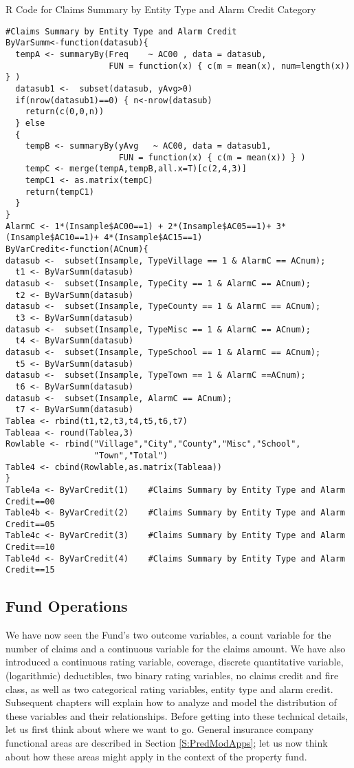 \documentclass[]{book}
\theoremstyle{definition}
\theoremstyle{definition}
\theoremstyle{definition}
\theoremstyle{remark}
\begin{document}
R Code for Claims Summary by Entity Type and Alarm Credit Category

\hypertarget{display.RateAlarmCredit.2}{}
\begin{verbatim}
#Claims Summary by Entity Type and Alarm Credit
ByVarSumm<-function(datasub){
  tempA <- summaryBy(Freq    ~ AC00 , data = datasub,   
                     FUN = function(x) { c(m = mean(x), num=length(x)) } )
  datasub1 <-  subset(datasub, yAvg>0)
  if(nrow(datasub1)==0) { n<-nrow(datasub)
    return(c(0,0,n))
  } else 
  {
    tempB <- summaryBy(yAvg   ~ AC00, data = datasub1,
                       FUN = function(x) { c(m = mean(x)) } )
    tempC <- merge(tempA,tempB,all.x=T)[c(2,4,3)]
    tempC1 <- as.matrix(tempC)
    return(tempC1)
  }
}
AlarmC <- 1*(Insample$AC00==1) + 2*(Insample$AC05==1)+ 3*(Insample$AC10==1)+ 4*(Insample$AC15==1)
ByVarCredit<-function(ACnum){
datasub <-  subset(Insample, TypeVillage == 1 & AlarmC == ACnum); 
  t1 <- ByVarSumm(datasub)
datasub <-  subset(Insample, TypeCity == 1 & AlarmC == ACnum);      
  t2 <- ByVarSumm(datasub)
datasub <-  subset(Insample, TypeCounty == 1 & AlarmC == ACnum);   
  t3 <- ByVarSumm(datasub)
datasub <-  subset(Insample, TypeMisc == 1 & AlarmC == ACnum);
  t4 <- ByVarSumm(datasub)
datasub <-  subset(Insample, TypeSchool == 1 & AlarmC == ACnum);    
  t5 <- ByVarSumm(datasub)
datasub <-  subset(Insample, TypeTown == 1 & AlarmC ==ACnum);      
  t6 <- ByVarSumm(datasub)
datasub <-  subset(Insample, AlarmC == ACnum);  
  t7 <- ByVarSumm(datasub)
Tablea <- rbind(t1,t2,t3,t4,t5,t6,t7)
Tableaa <- round(Tablea,3)
Rowlable <- rbind("Village","City","County","Misc","School",
                  "Town","Total")
Table4 <- cbind(Rowlable,as.matrix(Tableaa))
}
Table4a <- ByVarCredit(1)    #Claims Summary by Entity Type and Alarm Credit==00
Table4b <- ByVarCredit(2)    #Claims Summary by Entity Type and Alarm Credit==05 
Table4c <- ByVarCredit(3)    #Claims Summary by Entity Type and Alarm Credit==10
Table4d <- ByVarCredit(4)    #Claims Summary by Entity Type and Alarm Credit==15
\end{verbatim}

\subsection{Fund Operations}\label{fund-operations}

We have now seen the Fund's two outcome variables, a count variable for
the number of claims and a continuous variable for the claims amount. We
have also introduced a continuous rating variable, coverage, discrete
quantitative variable, (logarithmic) deductibles, two binary rating
variables, no claims credit and fire class, as well as two categorical
rating variables, entity type and alarm credit. Subsequent chapters will
explain how to analyze and model the distribution of these variables and
their relationships. Before getting into these technical details, let us
first think about where we want to go. General insurance company
functional areas are described in Section \ref{S:PredModApps}; let us
now think about how these areas might apply in the context of the
property fund.
\end{document}
